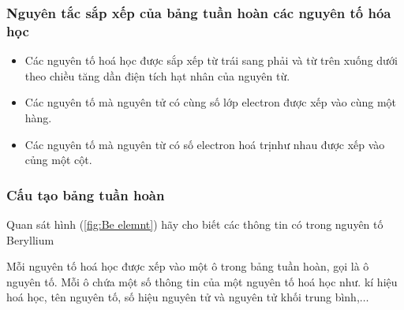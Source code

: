 \subsubsection{Nguyên tắc sắp xếp của bảng tuần hoàn các nguyên tố hóa học}
	\begin{tomtat}
		\begin{itemize}
			\item  Các nguyên tố hoá học được sắp xếp từ trái sang phải và từ trên xuống dưới theo chiều tăng dần điện tích hạt nhân của nguyên từ.
			\item  Các nguyên tố mà nguyên tử có cùng số lớp electron được xếp vào cùng một hàng.
			\item  Các nguyên tố mà nguyên từ có số electron hoá trị\footnotemark[1]  như nhau được xếp vào củng một cột.
		\end{itemize}
	\end{tomtat}
\subsubsection{Cấu tạo bảng tuần hoàn}
\begin{paracol}{2}
	\switchcolumn
	\begin{hoivadap}
		\begin{cauhoi}
			Quan sát hình (\ref{fig:Be elemnt}) hãy cho biết các thông tin có trong nguyên tố Beryllium
		\end{cauhoi}
	\end{hoivadap}
\end{paracol}
\begin{ghinho}
	 Mỗi nguyên tố hoá học được xếp vào một ô trong bảng tuần hoàn, gọi là ô nguyên tố. Mỗi ô chứa một số thông tin của một nguyên tố hoá học như. kí hiệu hoá học, tên nguyên tố, số hiệu nguyên tử và nguyên tử khối trung bình,$\ldots$
		\begin{center}
		\end{center}
\end{ghinho}

